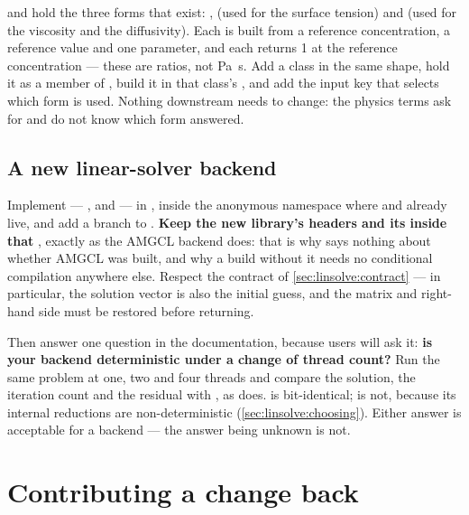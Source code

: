  and  hold the three forms
that exist: ,  (used for the
surface tension) and  (used for the viscosity and
the diffusivity). Each is built from a reference concentration, a reference
value and one parameter, and each returns 1 at the reference concentration ---
these are ratios, not \si{\pascal\second}. Add a class in the same shape, hold
it as a member of , build it in that class's
, and add the input key that selects which form is used. Nothing
downstream needs to change: the physics terms ask for
 and do not know which form answered.

\subsection{A new linear-solver backend}

Implement  --- ,  and
 --- in ,
inside the anonymous namespace where  and
 already live, and add a branch to
. \textbf{Keep the new library's headers and
its  inside that }, exactly as the AMGCL backend does:
that is why  says nothing about whether AMGCL was
built, and why a build without it needs no conditional compilation anywhere
else. Respect the contract of \cref{sec:linsolve:contract} --- in particular,
the solution vector is also the initial guess, and the matrix and right-hand
side must be restored before returning.

Then answer one question in the documentation, because users will ask it:
\textbf{is your backend deterministic under a change of thread count?} Run the
same problem at one, two and four threads and compare the solution, the
iteration count and the residual with \code{==}, as
 does.  is bit-identical;
 is not, because its internal reductions are
non-deterministic (\cref{sec:linsolve:choosing}). Either answer is acceptable
for a backend --- the answer being unknown is not.

\section{Contributing a change back}
\label{sec:extending:submitting}

